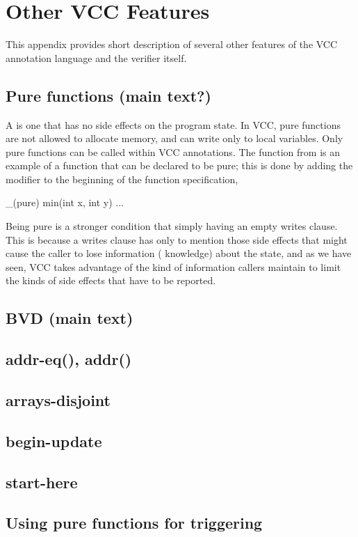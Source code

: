 \section{Other VCC Features}

This appendix provides short description of several other
features of the VCC annotation language and the verifier itself.

\subsection{Pure functions (main text?)}
\label{sect:pureFunctions}
A  is one that has no side effects on the program
state. In VCC, pure functions are not allowed to allocate memory, and can
write only to local variables. Only pure functions can be called within VCC
annotations. The function  from  is an
example of a function that can be declared to be pure; this is done by
adding the modifier  to the beginning of the function specification,
\eg
\begin{VCC}
_(pure) min(int x, int y) ...
\end{VCC}

Being pure is a stronger condition that simply having an empty writes
clause. This is because a writes clause has only to mention those side
effects that might cause the caller to lose information (\ie
knowledge) about the state, and as we have seen, VCC takes advantage
of the kind of information callers maintain to limit the kinds of side
effects that have to be reported.

\subsection{BVD (main text)}
\subsection{addr-eq(), addr()}
\subsection{arrays-disjoint}
\subsection{begin-update}
\subsection{start-here}
\subsection{Using pure functions for triggering}

